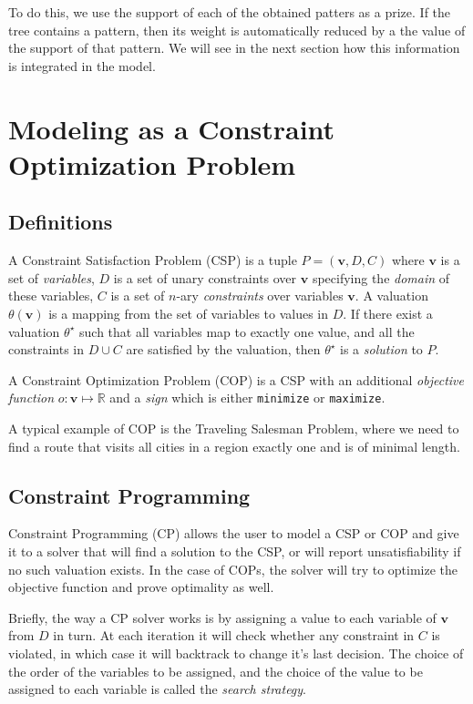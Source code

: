 \documentclass[letterpaper]{article} %
\begin{document}
To do this, we use the support of each of the obtained patters as a prize. If 
the tree contains a pattern, then its weight is automatically reduced by a the 
value of the support of that pattern. We will see in the next section how this 
information is integrated in the model.







\section{Modeling as a Constraint Optimization Problem}

\subsection{Definitions}
A Constraint Satisfaction Problem (CSP) is a tuple $P = (\boldsymbol{v},D,C)$ 
where $\boldsymbol{v}$ is a 
set of \emph{variables}, $D$ is a set of unary constraints over 
$\boldsymbol{v}$ specifying 
the \emph{domain} of these variables, $C$ is a set of $n$-ary 
\emph{constraints} over variables $\boldsymbol{v}$.
A valuation $\theta(\boldsymbol{v})$ is a mapping from the set of variables to 
values in $D$. If there exist a valuation $\theta^\star$ such that all 
variables map 
to exactly one value, and all the constraints in $D\cup C$ are satisfied by the 
valuation, then $\theta^\star$ is a \emph{solution} to $P$.

A Constraint Optimization Problem (COP) is a CSP with an additional 
\emph{objective function} $o : \boldsymbol{v} \mapsto \mathbb{R}$ and a 
\emph{sign} which is either \verb|minimize| or \verb|maximize|. 

A typical example of COP is the Traveling Salesman Problem, where we need to 
find a route that visits all cities in a region exactly one and is of minimal 
length.

\subsection{Constraint Programming}
Constraint Programming (CP) allows the user to model a CSP or COP and give it 
to a 
solver that will find a solution to the CSP, or will report unsatisfiability if 
no such valuation exists. In the case of COPs, the solver will try to optimize 
the objective function and prove optimality as well.

Briefly, the way a CP solver works is by assigning a value to each variable of 
$\boldsymbol{v}$ from $D$ in turn. At each iteration it will check whether any 
constraint in $C$ is violated, in which case it will backtrack to change it's 
last decision. The choice of the order of the variables to be assigned, and the 
choice of the value to be assigned to each variable is called the \emph{search 
strategy}.
\end{document}
